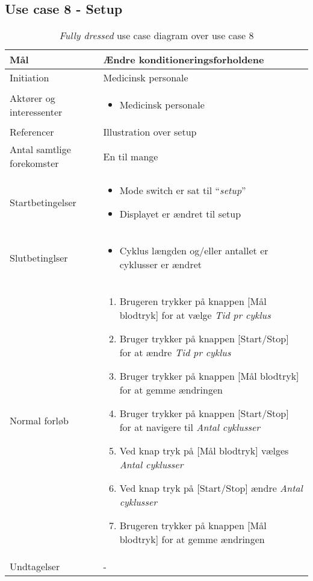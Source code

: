 	\subsection{Use case 8 - Setup}
		\begin{table}[H]
				\begin{center}
			\begin{tabular}{ | p{} | p{}| } 
				\hline
				Mål & Ændre konditioneringsforholdene \\ 
				\hline
				Initiation &  Medicinsk personale\\
				\hline
				Aktører og interessenter & 
				\begin{itemize}
					\item Medicinsk personale 
				\end{itemize} \\ 
				\hline
				Referencer & Illustration over setup \\ 
				\hline
				Antal samtlige forekomster & En til mange \\ 
				\hline	
				Startbetingelser & 
				\begin{itemize}
					\item Mode switch er sat til “\textit{setup}” 
					\item Displayet er ændret til setup
 				\end{itemize} \\ 
				\hline
				Slutbetinglser & 
				\begin{itemize}
					\item Cyklus længden og/eller antallet er cyklusser er ændret
				\end{itemize} \\ 
				\hline
				Normal forløb & \begin{enumerate}
					\setlength\itemsep{0cm} %
					\item Brugeren trykker på knappen [Mål blodtryk]  for at vælge \textit{Tid pr cyklus}
					\item Bruger trykker på knappen [Start/Stop] for at ændre \textit{Tid pr cyklus}
					\item Bruger trykker på knappen [Mål blodtryk]  for at gemme ændringen
					\item Bruger trykker på knappen [Start/Stop] for at navigere til \textit{Antal cyklusser}
					\item Ved knap tryk på [Mål blodtryk]  vælges \textit{Antal cyklusser}
					\item Ved knap tryk på [Start/Stop] ændre \textit{Antal cyklusser}
					\item Brugeren trykker på knappen [Mål blodtryk] for at gemme ændringen
				\end{enumerate} \\ 
				\hline
				Undtagelser & -  \\ 
				\hline
			\end{tabular}
		\end{center}

			\caption{\textit{Fully dressed} use case diagram over use case 8}
		\end{table}
			\newpage
